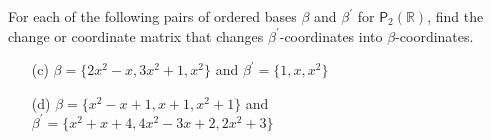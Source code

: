 For each of the following pairs of ordered bases $\beta$ and $\beta^\prime$
for $\mathsf{P}_2(\mathbb{R})$, find the change or coordinate matrix
that changes $\beta^\prime$-coordinates into $\beta$-coordinates.
\begin{enumerate}[(a)]
\item[(c)] $\beta = \{2x^2-x,3x^2+1,x^2\}$ and $\beta^\prime = \{1,x,x^2\}$
\item[(d)] $\beta = \{x^2 -x+1,x+1,x^2+1\}$ 
  and $\beta^\prime = \{x^2 +x+4,4x^2-3x+2,2x^2+3\}$
\end{enumerate}
